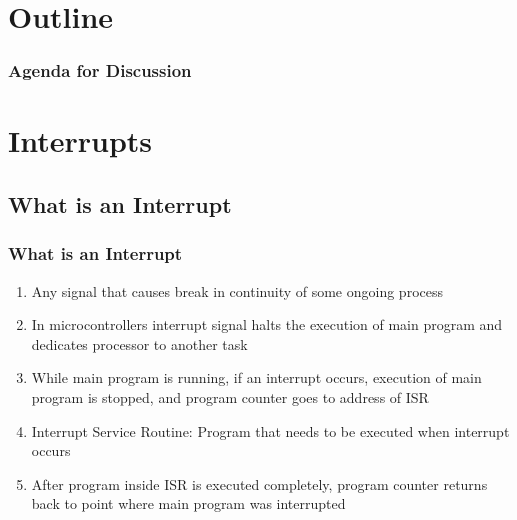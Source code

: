 \documentclass[table,10pt,red]{beamer}
\title
[
	Firebird LPC2148 Robotics Research Platform	%
	\hspace{0.5cm}
	\insertframenumber/\inserttotalframenumber
]
{
	Interrupts On Firebird-V Robot
}
\author
[
	www.e-yantra.org
]
{
	e-Yantra Team \\
  Embedded Real-Time Systems Lab\\
  Indian Institute of Technology-Bombay \\
}
\date
{
IIT Bombay \\ {\today}
}
\begin{document}
 

\begin{frame}
	\titlepage
\end{frame} 

\section*{Outline}
\begin{frame}[shrink=4]
	\frametitle{Agenda for Discussion}
	\tableofcontents
\end{frame} 


\section{Interrupts}
\subsection{What is an Interrupt}
	\begin{frame}
		\frametitle{What is an Interrupt} \pause
		\begin{enumerate}[$\checkmark$]
			\item<+-|alert@+> Any signal that causes break in continuity of some ongoing process \\[10pt]
			\item<+-|alert@+> In microcontrollers interrupt signal halts the execution of main program and dedicates processor to another task \\[10pt]
			\item<+-|alert@+> While main program is running, if an interrupt occurs, execution of main program is stopped, and program counter goes to address of ISR \\[10pt]  
			\item<+-|alert@+> Interrupt Service Routine: Program that needs to be executed when interrupt occurs \\[10pt]
			\item<+-|alert@+> After program inside ISR is executed completely, program counter returns back to point where main program was interrupted \\[10pt]
		\end{enumerate}  
	\end{frame}
	
\end{document}
